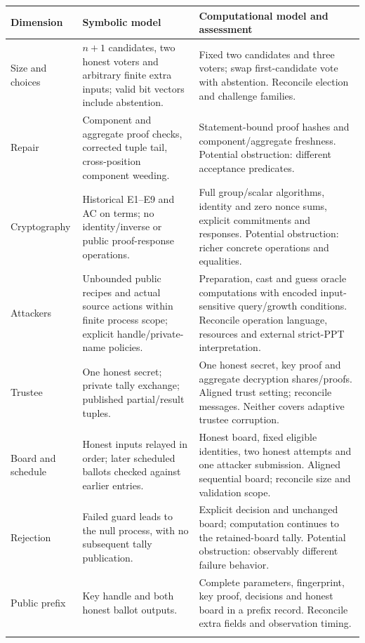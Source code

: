 \documentclass[11pt]{article}
\begin{document}
\small
\begin{longtable}{@{}p{.17\linewidth}p{.37\linewidth}p{.40\linewidth}@{}}
\toprule
Dimension & Symbolic model & Computational model and assessment\\\midrule
\endhead
Size and choices & $n+1$ candidates, two honest voters and arbitrary finite extra inputs; valid bit vectors include abstention. & Fixed two candidates and three voters; swap first-candidate vote with abstention. Reconcile election and challenge families.\\\addlinespace
Repair & Component and aggregate proof checks, corrected tuple tail, cross-position component weeding. & Statement-bound proof hashes and component/aggregate freshness. Potential obstruction: different acceptance predicates.\\\addlinespace
Cryptography & Historical E1--E9 and AC on terms; no identity/inverse or public proof-response operations. & Full group/scalar algorithms, identity and zero nonce sums, explicit commitments and responses. Potential obstruction: richer concrete operations and equalities.\\\addlinespace
Attackers & Unbounded public recipes and actual source actions within finite process scope; explicit handle/private-name policies. & Preparation, cast and guess oracle computations with encoded input-sensitive query/growth conditions. Reconcile operation language, resources and external strict-PPT interpretation.\\\addlinespace
Trustee & One honest secret; private tally exchange; published partial/result tuples. & One honest secret, key proof and aggregate decryption shares/proofs. Aligned trust setting; reconcile messages. Neither covers adaptive trustee corruption.\\\addlinespace
Board and schedule & Honest inputs relayed in order; later scheduled ballots checked against earlier entries. & Honest board, fixed eligible identities, two honest attempts and one attacker submission. Aligned sequential board; reconcile size and validation scope.\\\addlinespace
Rejection & Failed guard leads to the null process, with no subsequent tally publication. & Explicit decision and unchanged board; computation continues to the retained-board tally. Potential obstruction: observably different failure behavior.\\\addlinespace
Public prefix & Key handle and both honest ballot outputs. & Complete parameters, fingerprint, key proof, decisions and honest board in a prefix record. Reconcile extra fields and observation timing.\\\addlinespace

\end{longtable}
\end{document}
